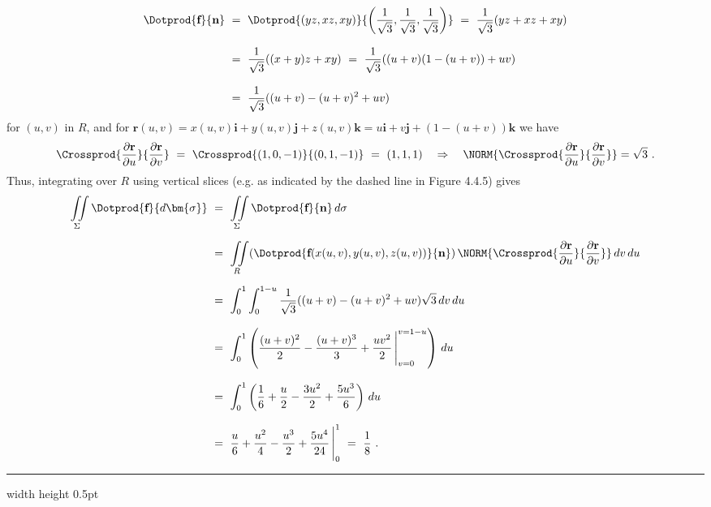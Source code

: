 \begin{exa}
 \begin{align*}
  \Dotprod{\textbf{f}}{\textbf{n}} ~&=~
   \Dotprod{(yz,xz,xy)}{\left( \frac{1}{\sqrt{3}},\frac{1}{\sqrt{3}},\frac{1}{\sqrt{3}} \right)}
   ~=~ \frac{1}{\sqrt{3}}(yz+xz+xy)\\[8pt]
   &=~ \frac{1}{\sqrt{3}}((x+y)z+xy)
   ~=~ \frac{1}{\sqrt{3}}((u+v)(1-(u+v))+uv)\\[8pt]
   &=~ \frac{1}{\sqrt{3}}((u+v)- (u+v)^2 + uv)
 \end{align*}
 for $(u,v)$ in $R$, and for $\textbf{r}(u,v)=x(u,v)\textbf{i} + y(u,v)\textbf{j} + z(u,v)\textbf{k} = u\textbf{i} +
 v\textbf{j} + (1-(u+v))\textbf{k}$ we have
 \begin{displaymath}
  \Crossprod{\frac{\partial \textbf{r}}{\partial u}}{\frac{\partial \textbf{r}}{\partial v}} ~=~
   \Crossprod{(1,0,-1)}{(0,1,-1)} ~=~ (1,1,1) \quad\Rightarrow\quad
   \NORM{\Crossprod{\frac{\partial \textbf{r}}{\partial u}}{\frac{\partial \textbf{r}}{\partial v}}} = \sqrt{3}~.
 \end{displaymath}
 Thus, integrating over $R$ using vertical slices (e.g. as indicated by the dashed line in Figure 4.4.5) gives
 \begin{align*}
  \iint\limits_{\Sigma} \Dotprod{\textbf{f}}{d\bm{\sigma}} ~&=~
   \iint\limits_{\Sigma} \Dotprod{\textbf{f}}{\textbf{n}}\,d\sigma\\[6pt]
   &=~ \iint\limits_{R} (\Dotprod{\textbf{f}(x(u,v),y(u,v),z(u,v))}{\textbf{n}})\,
    \NORM{\Crossprod{\frac{\partial \textbf{r}}{\partial u}}{\frac{\partial \textbf{r}}{\partial v}}}\,dv\,du\\[6pt]
   &=~ \int_0^1 \int_0^{1-u} \frac{1}{\sqrt{3}}((u+v)- (u+v)^2 + uv) \sqrt{3}\,dv\,du\\[8pt]
   &=~ \int_0^1 \left( \frac{(u+v)^2}{2} - \frac{(u+v)^3}{3} + \frac{uv^2}{2}\,\Bigg|_{v=0}^{v=1-u} \right)\,du\\[8pt]
   &=~ \int_0^1 \left( \frac{1}{6} + \frac{u}{2} - \frac{3u^2}{2} + \frac{5u^3}{6} \right)\,du\\[8pt]
   &=~ \frac{u}{6} + \frac{u^2}{4} - \frac{u^3}{2} + \frac{5u^4}{24}\,\Bigg|_0^1 ~=~ \frac{1}{8}~.
 \end{align*}
\end{exa}
\hrule width \textwidth height 0.5pt
\vspace{3mm}

